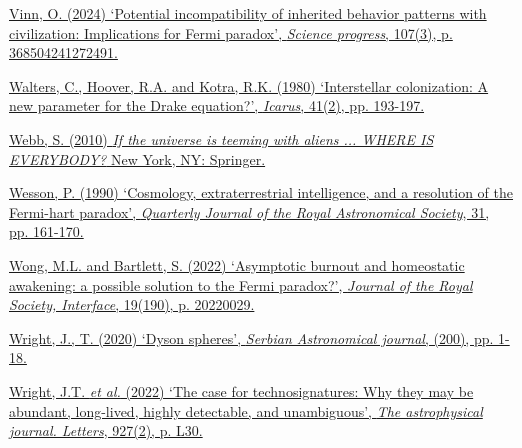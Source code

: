 \href{http://paperpile.com/b/hQuIW4/5aSj}{Vinn, O. (2024) `Potential incompatibility of inherited behavior patterns with civilization: Implications for Fermi paradox', \emph{Science progress}, 107(3), p. 368504241272491.}

\href{http://paperpile.com/b/hQuIW4/BUk6}{Walters, C., Hoover, R.A. and Kotra, R.K. (1980) `Interstellar colonization: A new parameter for the Drake equation?', \emph{Icarus}, 41(2), pp. 193-197.}

\href{http://paperpile.com/b/hQuIW4/fyLf}{Webb, S. (2010) \emph{If the universe is teeming with aliens ... WHERE IS EVERYBODY?} New York, NY: Springer.}

\href{http://paperpile.com/b/hQuIW4/xYaq}{Wesson, P. (1990) `Cosmology, extraterrestrial intelligence, and a resolution of the Fermi-hart paradox', \emph{Quarterly Journal of the Royal Astronomical Society}, 31, pp. 161-170.}

\href{http://paperpile.com/b/hQuIW4/S0Br}{Wong, M.L. and Bartlett, S. (2022) `Asymptotic burnout and homeostatic awakening: a possible solution to the Fermi paradox?', \emph{Journal of the Royal Society, Interface}, 19(190), p. 20220029.}

\href{http://paperpile.com/b/hQuIW4/vLy8}{Wright, J., T. (2020) `Dyson spheres', \emph{Serbian Astronomical journal}, (200), pp. 1-18.}

\href{http://paperpile.com/b/hQuIW4/r66q}{Wright, J.T. \emph{et al.} (2022) `The case for technosignatures: Why they may be abundant, long-lived, highly detectable, and unambiguous', \emph{The astrophysical journal. Letters}, 927(2), p. L30.}
